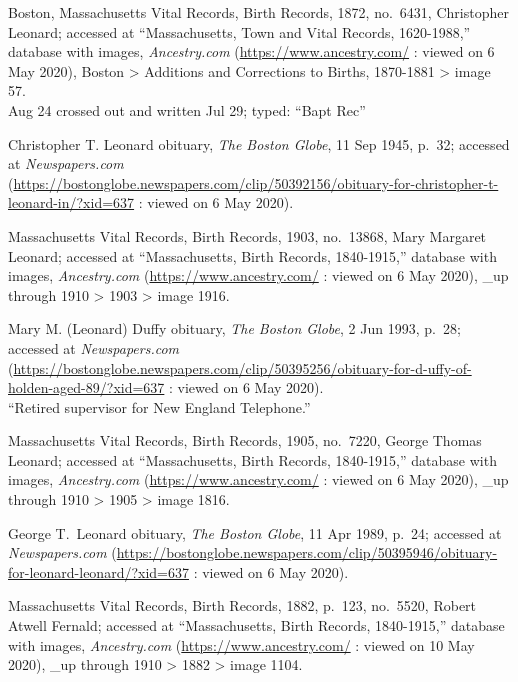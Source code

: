 \begin{thebibliography}{999}
	Boston, Massachusetts Vital Records, Birth Records, 1872, no.\ 6431, Christopher Leonard; accessed at ``Massachusetts, Town and Vital Records, 1620-1988,'' database with images, \textit{Ancestry.com} (\url{https://www.ancestry.com/} : viewed on 6 May 2020), Boston > Additions and Corrections to Births, 1870-1881 > image 57.\\
	Aug 24 crossed out and written Jul 29; typed: ``Bapt Rec''
	
	Christopher T. Leonard obituary, \textit{The Boston Globe}, 11 Sep 1945, p.\ 32; accessed at \textit{Newspapers.com} (\url{https://bostonglobe.newspapers.com/clip/50392156/obituary-for-christopher-t-leonard-in/?xid=637} : viewed on 6 May 2020).
	
	Massachusetts Vital Records, Birth Records, 1903, no.\ 13868, Mary Margaret Leonard; accessed at ``Massachusetts, Birth Records, 1840-1915,'' database with images, \textit{Ancestry.com} (\url{https://www.ancestry.com/} : viewed on 6 May 2020), \_up through 1910 > 1903 > image 1916.
	
	Mary M. (Leonard) Duffy obituary, \textit{The Boston Globe}, 2 Jun 1993, p.\ 28; accessed at \textit{Newspapers.com} (\url{https://bostonglobe.newspapers.com/clip/50395256/obituary-for-d-uffy-of-holden-aged-89/?xid=637} : viewed on 6 May 2020).\\
	``Retired supervisor for New England Telephone.''
	
	Massachusetts Vital Records, Birth Records, 1905, no.\ 7220, George Thomas Leonard; accessed at ``Massachusetts, Birth Records, 1840-1915,'' database with images, \textit{Ancestry.com} (\url{https://www.ancestry.com/} : viewed on 6 May 2020), \_up through 1910 > 1905 > image 1816.
	
	George T.\ Leonard obituary, \textit{The Boston Globe}, 11 Apr 1989, p.\ 24; accessed at \textit{Newspapers.com} (\url{https://bostonglobe.newspapers.com/clip/50395946/obituary-for-leonard-leonard/?xid=637} : viewed on 6 May 2020).
	
	Massachusetts Vital Records, Birth Records, 1882, p.\ 123, no.\ 5520, Robert Atwell Fernald; accessed at ``Massachusetts, Birth Records, 1840-1915,'' database with images, \textit{Ancestry.com} (\url{https://www.ancestry.com/} : viewed on 10 May 2020), \_up through 1910 > 1882 > image 1104.
	

\end{thebibliography}

